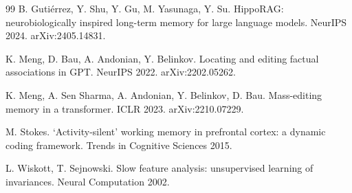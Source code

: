 \documentclass[11pt]{article}
\theoremstyle{plain}
\theoremstyle{definition}
\begin{document}
\begin{thebibliography}{99}
 B. Guti\'errez, Y. Shu, Y. Gu, M. Yasunaga, Y. Su. HippoRAG: neurobiologically inspired long-term memory for large language models. NeurIPS 2024. arXiv:2405.14831.

 K. Meng, D. Bau, A. Andonian, Y. Belinkov. Locating and editing factual associations in GPT. NeurIPS 2022. arXiv:2202.05262.

 K. Meng, A. Sen Sharma, A. Andonian, Y. Belinkov, D. Bau. Mass-editing memory in a transformer. ICLR 2023. arXiv:2210.07229.

 M. Stokes. `Activity-silent' working memory in prefrontal cortex: a dynamic coding framework. Trends in Cognitive Sciences 2015.

 L. Wiskott, T. Sejnowski. Slow feature analysis: unsupervised learning of invariances. Neural Computation 2002.

\end{thebibliography}
\end{document}

